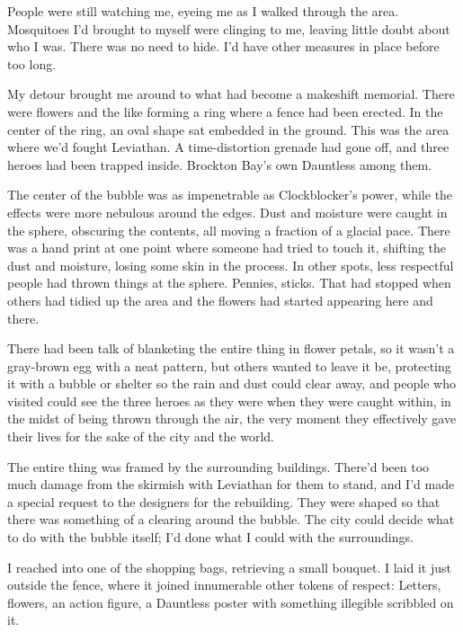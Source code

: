 People were still watching me, eyeing me as I walked through the area.  Mosquitoes I'd brought to myself were clinging to me, leaving little doubt about who I was.  There was no need to hide.  I'd have other measures in place before too long.



My detour brought me around to what had become a makeshift memorial.  There were flowers and the like forming a ring where a fence had been erected.  In the center of the ring, an oval shape sat embedded in the ground.  This was the area where we'd fought Leviathan.  A time-distortion grenade had gone off, and three heroes had been trapped inside.  Brockton Bay's own Dauntless among them.



The center of the bubble was as impenetrable as Clockblocker's power, while the effects were more nebulous around the edges.  Dust and moisture were caught in the sphere, obscuring the contents, all moving a fraction of a glacial pace.  There was a hand print at one point where someone had tried to touch it, shifting the dust and moisture, losing some skin in the process.  In other spots, less respectful people had thrown things at the sphere.  Pennies, sticks.  That had stopped when others had tidied up the area and the flowers had started appearing here and there.



There had been talk of blanketing the entire thing in flower petals, so it wasn't a gray-brown egg with a neat pattern, but others wanted to leave it be, protecting it with a bubble or shelter so the rain and dust could clear away, and people who visited could see the three heroes as they were when they were caught within, in the midst of being thrown through the air, the very moment they effectively gave their lives for the sake of the city and the world.



The entire thing was framed by the surrounding buildings.  There'd been too much damage from the skirmish with Leviathan for them to stand, and I'd made a special request to the designers for the rebuilding.  They were shaped so that there was something of a clearing around the bubble.  The city could decide what to do with the bubble itself; I'd done what I could with the surroundings.



I reached into one of the shopping bags, retrieving a small bouquet.  I laid it just outside the fence, where it joined innumerable other tokens of respect: Letters, flowers, an action figure, a Dauntless poster with something illegible scribbled on it.



